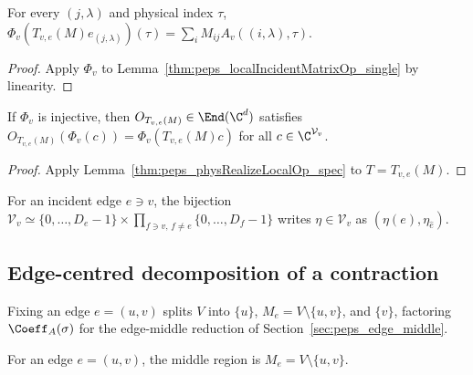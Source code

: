 \begin{lemma}%
    \label{thm:peps_localTensorMap_localIncidentMatrixOp_single}
    \leanok
    For every $(j,\lambda)$ and physical index $\tau$,
    $\Phi_v(T_{v,e}(M)e_{(j,\lambda)})(\tau)=\sum_i M_{ij}A_v((i,\lambda),\tau)$.
\end{lemma}
\begin{proof}\leanok
    Apply $\Phi_v$ to Lemma~\ref{thm:peps_localIncidentMatrixOp_single} by
    linearity.
\end{proof}

\begin{lemma}%
    \label{thm:peps_localIncidentMatrixOp_physicalRealization}
    \leanok
    If $\Phi_v$ is injective, then $O_{T_{v,e}(M)}\in\End(\C^d)$ satisfies
    $O_{T_{v,e}(M)}(\Phi_v(c))=\Phi_v(T_{v,e}(M)c)$ for all
    $c\in\C^{\mathcal V_v}$.
\end{lemma}
\begin{proof}\leanok
    Apply Lemma~\ref{thm:peps_physRealizeLocalOp_spec} to $T=T_{v,e}(M)$.
\end{proof}

\begin{definition}%
    \label{def:peps_localVirtualConfigSplitAt}
    \leanok
    For an incident edge $e\ni v$, the bijection
    $\mathcal V_v\simeq\{0,\ldots,D_e-1\}\times\prod_{f\ni v,\,f\ne e}\{0,\ldots,D_f-1\}$
    writes $\eta\in\mathcal V_v$ as $(\eta(e),\eta_{\widehat e})$.
\end{definition}

\subsection{Edge-centred decomposition of a contraction}

Fixing an edge $e=(u,v)$ splits $V$ into $\{u\}$, $M_e=V\setminus\{u,v\}$, and
$\{v\}$, factoring $\Coeff_A(\sigma)$ for the edge-middle reduction of
Section~\ref{sec:peps_edge_middle}.

\begin{definition}%
    \label{def:peps_edgeMiddleVertices}
    \leanok
    For an edge $e=(u,v)$, the middle region is $M_e=V\setminus\{u,v\}$.
\end{definition}

